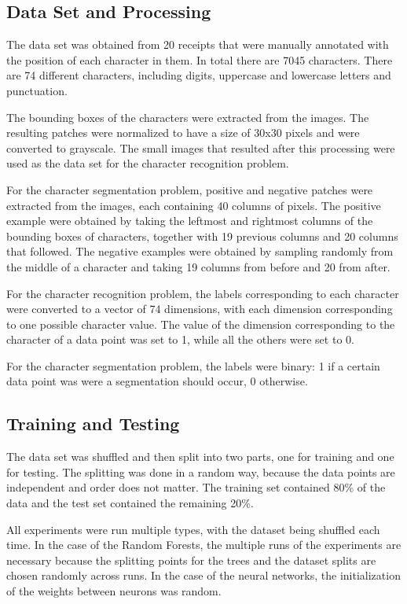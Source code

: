 \subsection{Data Set and Processing}
The data set was obtained from 20 receipts that were manually annotated with the position of each character in them. In total there are 7045 characters. There are 74 different characters, including digits, uppercase and lowercase letters and punctuation. 

The bounding boxes of the characters were extracted from the images. The resulting patches were normalized to have a size of 30x30 pixels and were converted to grayscale. The small images that resulted after this processing were used as the data set for the character recognition problem.

For the character segmentation problem, positive and negative patches were extracted from the images, each containing 40 columns of pixels. The positive example were obtained by taking the leftmost and rightmost columns of the bounding boxes of characters, together with 19 previous columns and 20 columns that followed. The negative examples were obtained by sampling randomly from the middle of a character and taking 19 columns from before and 20 from after.

For the character recognition problem, the labels corresponding to each character were converted to a vector of 74 dimensions, with each dimension corresponding to one possible character value. The value of the dimension corresponding to the character of a data point was set to 1, while all the others were set to 0. 

For the character segmentation problem, the labels were binary: 1 if a certain data point was were a segmentation should occur, 0 otherwise. 

\subsection{Training and Testing}
The data set was shuffled and then split into two parts, one for training and one for testing. The splitting was done in a random way, because the data points are independent and order does not matter. The training set contained 80\% of the data and the test set contained the remaining 20\%. 

All experiments were run multiple types, with the dataset being shuffled each time. In the case of the Random Forests, the multiple runs of the experiments are necessary because the splitting points for the trees and the dataset splits are chosen randomly across runs. In the case of the neural networks, the initialization of the weights between neurons was random. 
